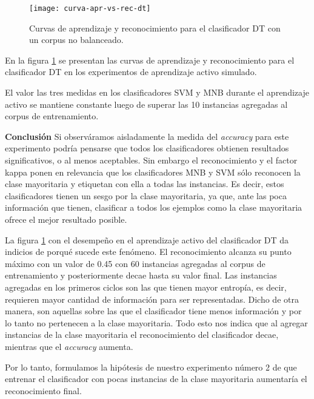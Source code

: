\begin{figure}[h!]
\centering
\texttt{[image: curva-apr-vs-rec-dt]}
\caption{Curvas de aprendizaje y reconocimiento para el clasificador DT con un corpus no balanceado.}\label{curva-apr-vs-rec-dt}
\end{figure}

En la figura \ref{curva-apr-vs-rec-dt} se presentan las curvas de aprendizaje y reconocimiento para el clasificador DT en los experimentos de aprendizaje activo simulado.

El valor las tres medidas en los clasificadores SVM y MNB durante el aprendizaje activo se mantiene constante luego de superar las 10 instancias agregadas al corpus de entrenamiento.

\vspace{3 mm}

\textbf{Conclusión}
Si observáramos aisladamente la medida del \textit{accuracy} para este experimento podría pensarse que todos los clasificadores obtienen resultados significativos, o al menos aceptables. Sin embargo el reconocimiento y el factor kappa ponen en relevancia que los clasificadores MNB y SVM sólo reconocen la clase mayoritaria y etiquetan con ella a todas las instancias. Es decir, estos clasificadores tienen un sesgo por la clase mayoritaria, ya que, ante las poca información que tienen, clasificar a todos los ejemplos como la clase mayoritaria ofrece el mejor resultado posible.

La figura \ref{curva-apr-vs-rec-dt} con el desempeño en el aprendizaje activo del clasificador DT da indicios de porqué sucede este fenómeno. El reconocimiento alcanza su punto máximo con un valor de 0.45 con 60 instancias agregadas al corpus de entrenamiento y posteriormente decae hasta su valor final. Las instancias agregadas en los primeros ciclos son las que tienen mayor entropía, es decir, requieren mayor cantidad de información para ser representadas. Dicho de otra manera, son aquellas sobre las que el clasificador tiene menos información y por lo tanto no pertenecen a la clase mayoritaria. Todo esto nos indica que al agregar instancias de la clase mayoritaria el reconocimiento del clasificador decae, mientras que el \textit{accuracy} aumenta.

Por lo tanto, formulamos la hipótesis de nuestro experimento número 2 de que entrenar el clasificador con pocas instancias de la clase mayoritaria aumentaría el reconocimiento final.

